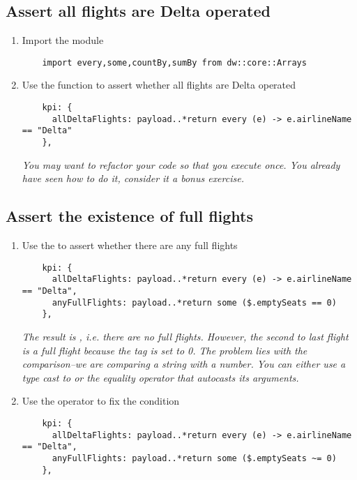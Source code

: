 \subsection{Assert all flights are Delta operated}
\begin{enumerate}[resume*]
\item Import the  module
  \begin{verbatim}
    import every,some,countBy,sumBy from dw::core::Arrays
  \end{verbatim}
\item Use the  function to assert whether all flights are Delta operated
  \begin{verbatim}
    kpi: {
      allDeltaFlights: payload..*return every (e) -> e.airlineName == "Delta"
    },
  \end{verbatim}
  \emph{
    You may want to refactor your code so that you execute  once.  You already have seen how to do it, consider it a bonus exercise.
  }
\end{enumerate}

\subsection{Assert the existence of full flights}
\begin{enumerate}[resume*]
\item Use the  to assert whether there are any full flights
  \begin{verbatim}
    kpi: {
      allDeltaFlights: payload..*return every (e) -> e.airlineName == "Delta",
      anyFullFlights: payload..*return some ($.emptySeats == 0)
    },
  \end{verbatim}
  \emph{
    The result is , i.e. there are no full flights.  However, the second to last flight is a full flight because the  tag is set to 0.  The problem lies with the comparison--we are comparing a string with a number.  You can either use a type cast to  or the equality operator \ttt{\textasciitilde=} that autocasts its arguments.
  }
\item Use the operator \ttt{\textasciitilde=} to fix the  condition
  \begin{verbatim}
    kpi: {
      allDeltaFlights: payload..*return every (e) -> e.airlineName == "Delta",
      anyFullFlights: payload..*return some ($.emptySeats ~= 0)
    },
  \end{verbatim}
\end{enumerate}


